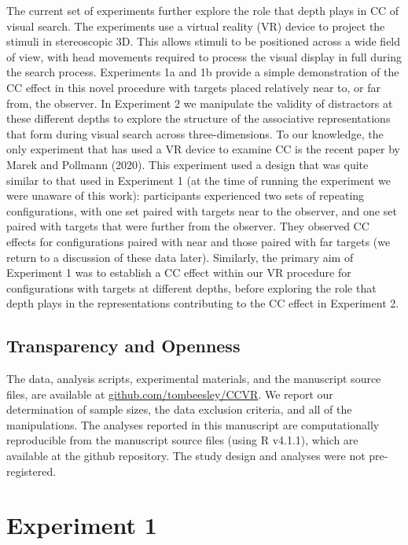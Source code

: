 \documentclass[
  man,floatsintext]{apa7}
\begin{document}
The current set of experiments further explore the role that depth plays in CC of visual search. The experiments use a virtual reality (VR) device to project the stimuli in stereoscopic 3D. This allows stimuli to be positioned across a wide field of view, with head movements required to process the visual display in full during the search process. Experiments 1a and 1b provide a simple demonstration of the CC effect in this novel procedure with targets placed relatively near to, or far from, the observer. In Experiment 2 we manipulate the validity of distractors at these different depths to explore the structure of the associative representations that form during visual search across three-dimensions. To our knowledge, the only experiment that has used a VR device to examine CC is the recent paper by Marek and Pollmann (2020). This experiment used a design that was quite similar to that used in Experiment 1 (at the time of running the experiment we were unaware of this work): participants experienced two sets of repeating configurations, with one set paired with targets near to the observer, and one set paired with targets that were further from the observer. They observed CC effects for configurations paired with near and those paired with far targets (we return to a discussion of these data later). Similarly, the primary aim of Experiment 1 was to establish a CC effect within our VR procedure for configurations with targets at different depths, before exploring the role that depth plays in the representations contributing to the CC effect in Experiment 2.

\hypertarget{transparency-and-openness}{%
\subsection{Transparency and Openness}\label{transparency-and-openness}}

The data, analysis scripts, experimental materials, and the manuscript source files, are available at \href{https://github.com/tombeesley/CCVR}{github.com/tombeesley/CCVR}. We report our determination of sample sizes, the data exclusion criteria, and all of the manipulations. The analyses reported in this manuscript are computationally reproducible from the manuscript source files (using R v4.1.1), which are available at the github repository. The study design and analyses were not pre-registered.

\hypertarget{experiment-1}{%
\section{Experiment 1}\label{experiment-1}}
\end{document}
